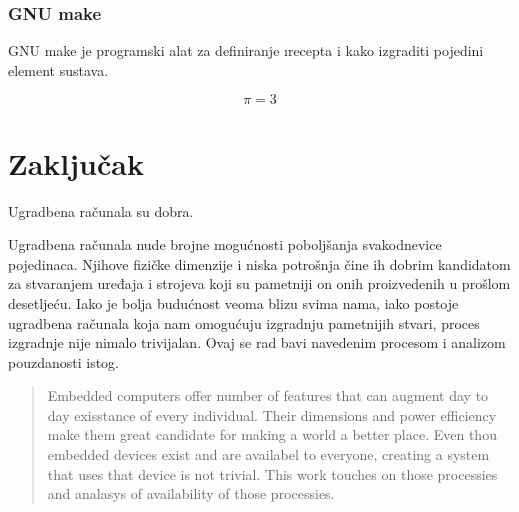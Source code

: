 \documentclass[times, utf8, diplomski]{fer}
\begin{document}
\subsection{GNU make}
GNU make je programski alat za definiranje \i{recepta} i kako izgraditi pojedini element sustava.

\begin{equation}
  \pi=3
\end{equation}

\chapter{Zaključak}
Ugradbena računala su dobra.




\begin{sazetak}
  Ugradbena ra\v{c}unala nude brojne mogućnosti poboljšanja svakodnevice pojedinaca. Njihove fizičke dimenzije i niska potrošnja čine ih dobrim kandidatom za stvaranjem uređaja i strojeva koji su pametniji on onih proizvedenih u prošlom desetljeću. Iako je bolja budućnost veoma blizu svima nama, iako postoje ugradbena računala koja nam omogućuju izgradnju pametnijih stvari, proces izgradnje nije nimalo trivijalan. Ovaj se rad bavi navedenim procesom i analizom pouzdanosti istog.

\end{sazetak}


\begin{abstract}
Embedded computers offer number of features that can augment day to day exisstance of every individual. Their dimensions and power efficiency make them great candidate for making a world a better place. Even thou embedded devices exist and are availabel to everyone, creating a system that uses that device is not trivial. This work touches on those processies and analasys of availability of those processies.

\end{abstract}
\end{document}
